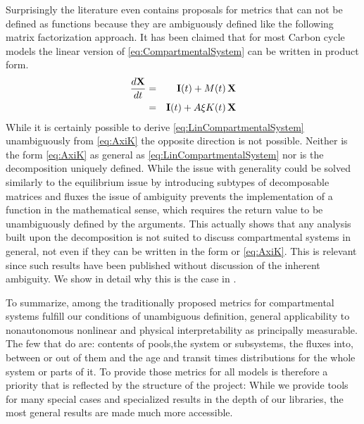 Surprisingly the literature even contains proposals for metrics that can not be defined as functions because they are ambiguously defined like the following matrix factorization approach.  It has been claimed that for most Carbon cycle models the linear version of \eqref{eq:CompartmentalSystem} can be written in product form.
\begin{eqnarray} 
  \frac{d\mathbf{X}}{dt} &=& \mathbf{I}(t) + M(t) \, \mathbf{X} 
  \label{eq:LinCompartmentalSystem} 
  \\
                &=& \mathbf{I}(t) + A \xi K(t) \, \mathbf{X}
  \label{eq:AxiK}
\end{eqnarray}
While it is certainly possible to derive \eqref{eq:LinCompartmentalSystem} unambiguously from \eqref{eq:AxiK} the opposite direction is not possible. Neither is the form \eqref{eq:AxiK} as general as \eqref{eq:LinCompartmentalSystem} nor is the decomposition uniquely defined.
While the issue with generality could be solved similarly to the equilibrium
issue by introducing subtypes of decomposable matrices and fluxes the issue of
ambiguity prevents the implementation of a function in the mathematical sense, which requires the return value to be unambiguously defined by the arguments.
This actually shows that any analysis built upon the decomposition is not
suited to discuss compartmental systems in general, not even if they can be
written in the form or \eqref{eq:AxiK}. This is relevant since such results have been published without discussion of the inherent ambiguity. We show in detail why this is the case in .

To summarize, among the traditionally proposed 
metrics for compartmental systems fulfill our conditions of unambiguous definition, general applicability to nonautonomous nonlinear and physical interpretability as principally measurable. The few that do are:
contents of pools,the system or subsystems, the fluxes into, between or out of them and the age and transit times distributions for the whole system or parts of it.  
To provide those metrics for all models is therefore a priority that is reflected by the structure of the project:
While we provide tools for many special cases and specialized results in the depth of our libraries, the most general results
are made much more accessible.

